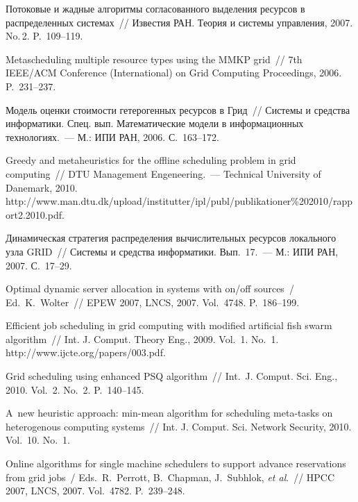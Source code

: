 \begin{multicols}{2}
{{\begin{thebibliography}{99}
Потоковые и жадные алгоритмы согласованного выделения ресурсов в распределенных системах~// Известия РАН. 
Теория и системы управ\-ле\-ния, 2007. No.\,2. P.~109--119.

  Metascheduling multiple resource types using the MMKP grid~// 7th IEEE/ACM Conference 
(International) on Grid Computing Proceedings, 2006. P.~231--237.
  
  Модель оценки стоимости гетерогенных ресурсов в Грид~// Системы и средства 
информатики. Спец. вып. Математические модели в информационных технологиях.~--- М.: 
ИПИ РАН, 2006. С.~163--172.
  
  Greedy and metaheuristics for the offline scheduling problem in grid computing~// DTU 
Management Engeneering.~--- Technical University of Danemark, 2010. {\sf 
http://www.man.dtu.dk/\linebreak upload/institutter/ipl/publ/publikationer\%202010/\linebreak rapport2.2010.pdf}.
  
  Динамическая стратегия распределения вычислительных ресурсов локального узла 
GRID~// Системы и средства информатики. Вып.~17.~--- М.: ИПИ РАН, 2007. С.~17--29.
  
  Optimal dynamic server allocation in systems with on/off sources~/ Ed.\ K.~Wolter~// EPEW 
2007, LNCS, 2007. Vol.~4748. P.~186--199.
  
  Efficient job scheduling in grid computing with modified artificial fish swarm algorithm~// 
Int. J. Comput. Theory Eng., 2009. Vol.~1. No.~1. 
{\sf http://www.ijcte.org/papers/003.pdf}.
  
  Grid scheduling using enhanced PSQ algorithm~// Int.\ J. Comput. Sci. Eng., 
2010. Vol.~2. No.~2. P.~140--145.
  
  A~new heuristic approach: min-mean algorithm for scheduling meta-tasks on heterogenous 
computing systems~// Int. J. Comput. Sci. Network Security, 2010. Vol.~10. No.~1.
  
  Online algorithms for single machine schedulers to support advance reservations from grid 
jobs~/ Eds.\ R.~Perrott, B.~Chapman, J.~Subhlok, \textit{et al}.~// HPCC 2007, LNCS, 2007. Vol.~4782. P.~239--248.
  

\end{thebibliography}}}
\end{multicols}
